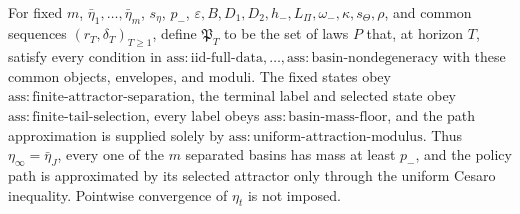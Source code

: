For fixed \(m\), \(\bar\eta_1,\ldots,\bar\eta_m\), \(s_\eta\), \(p_-\), \(\varepsilon,B,D_1,D_2,h_-,L_\Pi,\omega_-,\kappa,s_\Theta,\rho\), and common sequences \((r_T,\delta_T)_{T\ge1}\), define \(\mathfrak P_T\) to be the set of laws \(P\) that, at horizon \(T\), satisfy every condition in \(\mathrm{ass:iid\text{-}full\text{-}data},\ldots,\mathrm{ass:basin\text{-}nondegeneracy}\) with these common objects, envelopes, and moduli. The fixed states obey \(\mathrm{ass:finite\text{-}attractor\text{-}separation}\), the terminal label and selected state obey \(\mathrm{ass:finite\text{-}tail\text{-}selection}\), every label obeys \(\mathrm{ass:basin\text{-}mass\text{-}floor}\), and the path approximation is supplied solely by \(\mathrm{ass:uniform\text{-}attraction\text{-}modulus}\). Thus \(\eta_\infty=\bar\eta_J\), every one of the \(m\) separated basins has mass at least \(p_-\), and the policy path is approximated by its selected attractor only through the uniform Cesaro inequality. Pointwise convergence of \(\eta_t\) is not imposed.